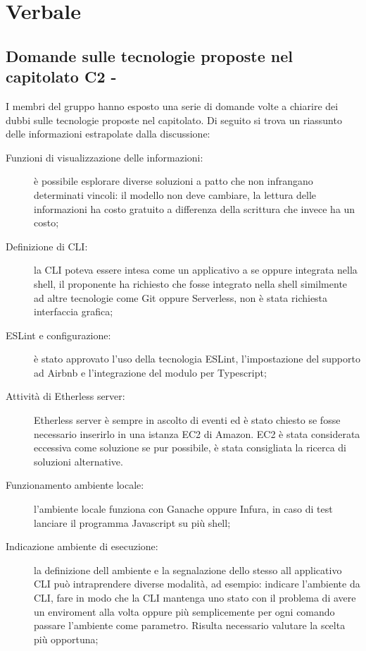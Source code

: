 \section{Verbale}
\subsection{Domande sulle tecnologie proposte nel capitolato C2 - \NomeProgetto}
I membri del gruppo hanno esposto una serie di domande volte a chiarire dei dubbi sulle tecnologie proposte nel capitolato.
Di seguito si trova un riassunto delle informazioni estrapolate dalla discussione:
\begin{description}
	\item[Funzioni di visualizzazione delle informazioni:] è possibile esplorare diverse soluzioni a patto che non infrangano determinati vincoli: il modello non deve cambiare, la lettura delle informazioni ha costo gratuito a differenza della scrittura che invece ha un costo;
	\item[Definizione di CLI:] la CLI poteva essere intesa come un applicativo a se oppure integrata nella shell, il proponente ha richiesto che fosse integrato nella shell similmente ad altre tecnologie come Git oppure Serverless, non è stata richiesta interfaccia grafica;
	\item[ESLint e configurazione:] è stato approvato l'uso della tecnologia ESLint, l'impostazione del supporto ad Airbnb e l'integrazione del modulo per Typescript;
	\item[Attività di Etherless server:] Etherless server è sempre in ascolto di eventi ed è stato chiesto se fosse necessario inserirlo in una istanza EC2 di Amazon. EC2 è stata considerata eccessiva come soluzione se pur possibile, è stata consigliata la ricerca di soluzioni alternative.
	\item[Funzionamento ambiente locale: ] l'ambiente locale funziona con Ganache oppure Infura, in caso di test lanciare il programma Javascript su più shell;
	\item[Indicazione ambiente di esecuzione:] la definizione dell ambiente e la segnalazione dello stesso all applicativo CLI può intraprendere diverse modalità, ad esempio: indicare l'ambiente da CLI, fare in modo che la CLI mantenga uno stato con il problema di avere un enviroment alla volta oppure più semplicemente per ogni comando passare l'ambiente come parametro. Risulta necessario valutare la scelta più opportuna;

\end{description}
